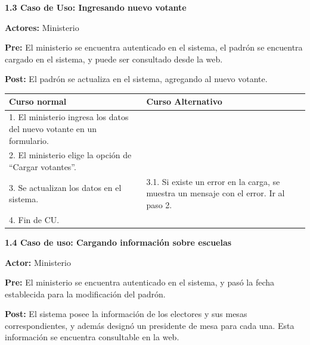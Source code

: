 \textbf{1.3 Caso de Uso: Ingresando nuevo votante}

\textbf{Actores:} Ministerio

\textbf{Pre:} El ministerio se encuentra autenticado en el sistema, el padrón se encuentra cargado en el sistema, y puede ser consultado desde la web.

\textbf{Post:} El padrón se actualiza en el sistema, agregando al nuevo votante.
\begin{table}[h!]
	
 \begin{tabular}{|p{7.5cm} | p{7.5cm}|} 
 \hline
 \textbf{Curso normal} & \textbf{Curso Alternativo} \\
 \hline

1. El ministerio ingresa los datos del nuevo votante en un formulario. & \\
\hline

2. El ministerio elige la opción de “Cargar votantes”. & \\
\hline

3. Se actualizan los datos en el sistema. & 3.1. Si existe un error en la carga, se muestra un mensaje con el error. Ir al paso 2. \\
\hline
4. Fin de CU. & \\
 \hline
 \end{tabular}

\end{table}

\newpage

\textbf{1.4 Caso de uso: Cargando información sobre escuelas}

\textbf{Actor:} Ministerio

\textbf{Pre:} El ministerio se encuentra autenticado en el sistema, y pasó la fecha establecida para la modificación del padrón.

\textbf{Post:} El sistema posee la información de los electores y sus mesas correspondientes, y además designó un presidente de mesa para cada una. Esta información se encuentra consultable en la web.


